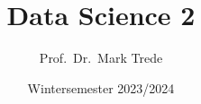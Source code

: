 \documentclass[12pt,show notes]{beamer}
\begin{document}
\title{Data Science 2}
\author{Prof.~Dr.~Mark Trede}
\date{Wintersemester 2023/2024}
\maketitle


\end{document}
